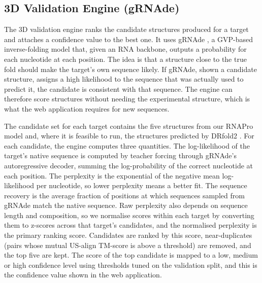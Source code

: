 \documentclass{FastFyp}
\begin{document}
\subsection{3D Validation Engine (gRNAde)}
\label{sec:impl-grnade}
The 3D validation engine ranks the candidate structures produced for a target and attaches a confidence value to the best one. It uses gRNAde \cite{joshi2025grnade}, a GVP-based inverse-folding model that, given an RNA backbone, outputs a probability for each nucleotide at each position. The idea is that a structure close to the true fold should make the target's own sequence likely. If gRNAde, shown a candidate structure, assigns a high likelihood to the sequence that was actually used to predict it, the candidate is consistent with that sequence. The engine can therefore score structures without needing the experimental structure, which is what the web application requires for new sequences.

The candidate set for each target contains the five structures from our RNAPro model and, where it is feasible to run, the structures predicted by DRfold2 \cite{ref:Li:2026}. For each candidate, the engine computes three quantities. The log-likelihood of the target's native sequence is computed by teacher forcing through gRNAde's autoregressive decoder, summing the log-probability of the correct nucleotide at each position. The perplexity is the exponential of the negative mean log-likelihood per nucleotide, so lower perplexity means a better fit. The sequence recovery is the average fraction of positions at which sequences sampled from gRNAde match the native sequence. Raw perplexity also depends on sequence length and composition, so we normalise scores within each target by converting them to z-scores across that target's candidates, and the normalised perplexity is the primary ranking score. Candidates are ranked by this score, near-duplicates (pairs whose mutual US-align TM-score is above a threshold) are removed, and the top five are kept. The score of the top candidate is mapped to a low, medium or high confidence level using thresholds tuned on the validation split, and this is the confidence value shown in the web application.
\end{document}
